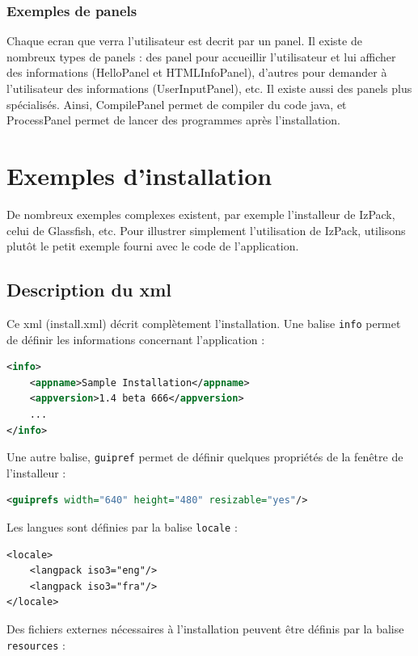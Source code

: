 \subsubsection{Exemples de panels}
Chaque ecran que verra l'utilisateur est decrit par un panel.
Il existe de nombreux types de panels : des panel pour accueillir l'utilisateur et lui afficher des informations (HelloPanel et HTMLInfoPanel), d'autres pour demander à l'utilisateur des informations (UserInputPanel), etc.
Il existe aussi des panels plus spécialisés. Ainsi, CompilePanel permet de compiler du code java, et ProcessPanel permet de lancer des programmes après l'installation.


\section{Exemples d'installation}
De nombreux exemples complexes existent, par exemple l'installeur de IzPack, celui de Glassfish, etc. Pour illustrer simplement l'utilisation de IzPack, utilisons plutôt le petit exemple fourni avec le code de l'application.

\subsection{Description du xml}


Ce xml (install.xml) décrit complètement l'installation.
Une balise \verb|info| permet de définir les informations concernant l'application : 
\begin{lstlisting}[language=xml]
<info>
	<appname>Sample Installation</appname>
	<appversion>1.4 beta 666</appversion>
	...
</info>
\end{lstlisting}
Une autre balise, \verb|guipref| permet de définir quelques propriétés de la fenêtre de l'installeur :
\begin{lstlisting}[language=xml]
<guiprefs width="640" height="480" resizable="yes"/>
\end{lstlisting}
Les langues sont définies par la balise \verb|locale| :
\begin{lstlisting}
<locale>
	<langpack iso3="eng"/>
	<langpack iso3="fra"/>
</locale>
\end{lstlisting}
Des fichiers externes nécessaires à l'installation peuvent être définis par la balise \verb|resources| :

